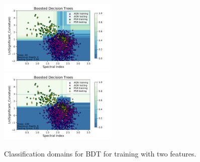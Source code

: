 \begin{figure}[h]
\includegraphics[width=0.5\textwidth]{plots/classification_domains/bdt_20_2.pdf}
\includegraphics[width=0.5\textwidth]{plots/classification_domains/bdt_100_6.pdf}
\caption{Classification domains for BDT for training with two features.
}
\label{fig:BDT_domains}
\end{figure}


